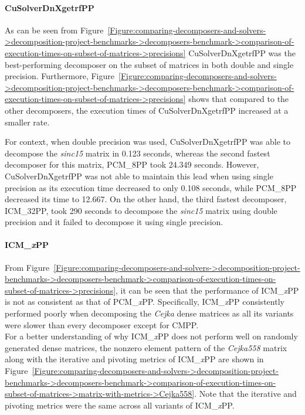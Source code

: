 \paragraph{CuSolverDnXgetrfPP} As can be seen from Figure~\ref{Figure:comparing-decomposers-and-solvers->decomposition-project-benchmarks->decomposers-benchmark->comparison-of-execution-times-on-subset-of-matrices->precisions} CuSolverDnXgetrfPP was the best-performing decomposer on the subset of matrices in both double and single precision.
Furthermore, Figure~\ref{Figure:comparing-decomposers-and-solvers->decomposition-project-benchmarks->decomposers-benchmark->comparison-of-execution-times-on-subset-of-matrices->precisions} shows that compared to the other decomposers, the execution times of CuSolverDnXgetrfPP increased at a smaller rate.

For context, when double precision was used, CuSolverDnXgetrfPP was able to decompose the \textit{sinc15} matrix in 0.123 seconds, whereas the second fastest decomposer for this matrix, PCM\_8PP took 24.349 seconds.
However, CuSolverDnXgetrfPP was not able to maintain this lead when using single precision as its execution time decreased to only 0.108 seconds, while PCM\_8PP decreased its time to 12.667.
On the other hand, the third fastest decomposer, ICM\_32PP, took 290 seconds to decompose the \textit{sinc15} matrix using double precision and it failed to decompose it using single precision.

\paragraph{ICM\_\textit{x}PP} From Figure~\ref{Figure:comparing-decomposers-and-solvers->decomposition-project-benchmarks->decomposers-benchmark->comparison-of-execution-times-on-subset-of-matrices->precisions}, it can be seen that the performance of ICM\_\textit{x}PP is not as consistent as that of PCM\_\textit{x}PP.
Specifically, ICM\_\textit{x}PP consistently performed poorly when decomposing the \textit{Cejka} dense matrices as all its variants were slower than every decomposer except for CMPP.\\
For a better understanding of why ICM\_\textit{x}PP does not perform well on randomly generated dense matrices, the nonzero element pattern of the \textit{Cejka558} matrix along with the iterative and pivoting metrics of ICM\_\textit{x}PP are shown in Figure~\ref{Figure:comparing-decomposers-and-solvers->decomposition-project-benchmarks->decomposers-benchmark->comparison-of-execution-times-on-subset-of-matrices->matrix-with-metrics->Cejka558}.
Note that the iterative and pivoting metrics were the same across all variants of ICM\_\textit{x}PP.

